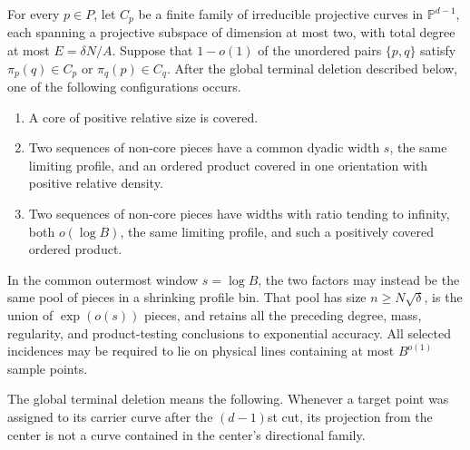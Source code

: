 \begin{proposition}\label{prop:prof-pair-selection}
For every $p\in P$, let $C_p$ be a finite family of irreducible projective curves in $\mathbb{P}^{d-1}$, each spanning a projective subspace of dimension at most two, with total degree at most $E=\delta N/A$. Suppose that $1-o(1)$ of the unordered pairs $\{p,q\}$ satisfy $\pi_p(q)\in C_p$ or $\pi_q(p)\in C_q$.  After the global terminal deletion described below, one of the following configurations occurs.
\begin{enumerate}
\item A core of positive relative size is covered.
\item Two sequences of non-core pieces have a common dyadic width
$s$, the same limiting profile, and an ordered product covered in one orientation with positive relative density.
\item Two sequences of non-core pieces have widths with ratio
tending to infinity, both $o(\log B)$, the same limiting profile, and such a positively covered ordered product.
\end{enumerate}
In the common outermost window $s=\log B$, the two factors may instead be the same pool of pieces in a shrinking profile bin. That pool has size $n\ge N\sqrt\delta$, is the union of $\exp(o(s))$ pieces, and retains all the preceding degree, mass, regularity, and product-testing conclusions to exponential accuracy.  All selected incidences may be required to lie on physical lines containing at most $B^{o(1)}$ sample points.

The global terminal deletion means the following.  Whenever a target point was assigned to its carrier curve after the $(d-1)$st cut, its projection from the center is not a curve contained in the center's directional family.
\end{proposition}


